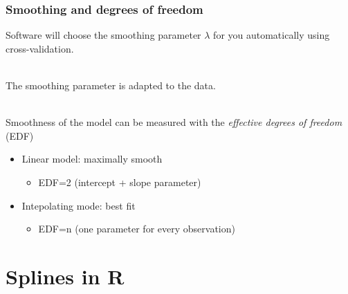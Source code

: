 \documentclass[aspectratio=169]{beamer}
\begin{document}
\begin{frame}
  \frametitle{Smoothing and degrees of freedom}
  
  Software will choose the smoothing parameter $\lambda$ for you
  automatically using cross-validation.

  ~\\
  The smoothing parameter is adapted to the data.

  ~\\
  Smoothness of the model can be measured with the {\em effective
    degrees of freedom} (EDF)
  \begin{itemize}
  \item Linear model: maximally smooth
    \begin{itemize}
    \item EDF=2 (intercept + slope parameter)
    \end{itemize}
  \item Intepolating mode: best fit
    \begin{itemize}
    \item EDF=n (one parameter for every observation)
    \end{itemize}
  \end{itemize}
  
\end{frame}
  

  

\section{Splines in R}

\end{document}
